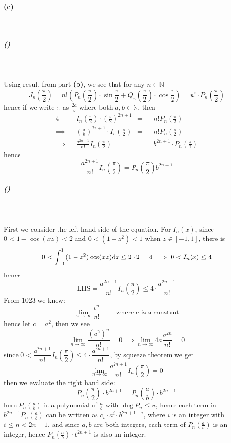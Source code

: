 \documentclass{article}
\def\N{\mathbb{N}}
\begin{document}
\paragraph{(c)}~{}
\subparagraph{()}~{}
\\\\Using result from part \textbf{(b)}, we see that for any $n\in \N$ 
$$J_n\left(\frac{\pi}{2}\right)=n!\left(P_n\left(\frac{\pi}{2}\right)\cdot \sin \frac{\pi}{2}+Q_n\left(\frac{\pi}{2}\right)\cdot \cos\frac{\pi}{2}\right)=n!\cdot P_n\left(\frac{\pi}{2}\right)$$
hence if we write $\pi$ as $\frac{2a}{b}$ where both $a, b\in \N$, then
\begin{alignat*}{4}
	&&I_n\left(\frac{\pi}{2}\right)\cdot \left(\frac{\pi}{2}\right)^{2n+1}&=&&n!P_n\left(\frac{\pi}{2}\right)
	\\\implies&&\left(\frac{a}{b}\right)^{2n+1}\cdot I_n\left(\frac{\pi}{2}\right)&=&&n!P_n\left(\frac{\pi}{2}\right)
	\\\implies&&\frac{a^{2n+1}}{n!}I_n\left(\frac{\pi}{2}\right)&=&&b^{2n+1}\cdot P_n\left(\frac{\pi}{2}\right)	
\end{alignat*}
hence
$$\frac{a^{2n+1}}{n!}I_n\left(\frac{\pi}{2}\right)=P_n\left(\frac{\pi}{2}\right)b^{2n+1}$$
\subparagraph{()}~{}
\\\\
First we consider the left hand side of the equation.
For $I_n(x)$, since $0<1-\cos(xz)<2$ and $0<(1-z^2)<1$ when $z\in [-1, 1]$, there is 
$$0< \int_{-1}^{1}(1-z^2)\cos(xz)\mathrm{d} z\le2\cdot 2=4\implies 0< I_n(x)\le 4$$
hence
$$\text{LHS}=\frac{a^{2n+1}}{n!}I_n\left(\frac{\pi}{2}\right)\le 4\cdot \frac{a^{2n+1}}{n!}$$
From 1023 we know:
$$\lim\limits_{n\to \infty}\frac{c^n}{n!} \text{$\qquad$ where c is a constant} $$
hence let $c=a^2$, then we see
$$\lim\limits_{n\to \infty} \frac{(a^2)^n}{n!}=0\implies \lim\limits_{n\to \infty} 4a\frac{a^{2n}}{n!}=0 $$
since $0< \dfrac{a^{2n+1}}{n!}I_n\left(\dfrac{\pi}{2}\right)\le 4\cdot \dfrac{a^{2n+1}}{n!}$, by squeeze theorem we get
$$\lim\limits_{n\to \infty}\frac{a^{2n+1}}{n!}I_n\left(\frac{\pi}{2}\right)=0$$
then we evaluate the right hand side:
$$P_n\left(\frac{\pi}{2}\right)\cdot b^{2n+1}=P_n\left(\frac{a}{b}\right)\cdot b^{2n+1}$$
here $P_n\left(\frac{a}{b}\right)$ is a polynomial of $\frac{a}{b}$ with $\deg P_n\le n$, hence each term in $b^{2n+1}P_n\left(\frac{a}{b}\right)$
can be written as $c_i\cdot a^i\cdot b^{2n+1-i}$, where $i$ is an integer with $i\le n<2n+1$, and since $ a, b$ are both integers, each term of $P_n\left(\frac{a}{b}\right)$ is an integer, hence $P_n\left(\frac{a}{b}\right)\cdot b^{2n+1}$ is also an integer.
\end{document}
